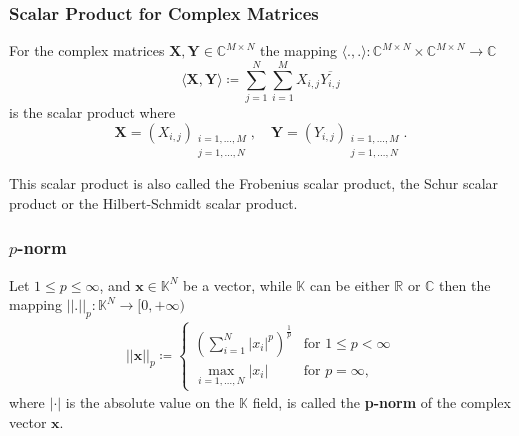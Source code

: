   \begin{frame}
    \frametitle{Scalar Product for Complex Matrices}
  \begin{Def}\label{def:scalar_product_induced_norm_complex_matrices}
      For the complex matrices $\boldsymbol{X},\boldsymbol{Y} \in \mathbb{C}^{M \times N}$ the mapping $\langle\boldsymbol{.},\boldsymbol{.}\rangle \colon \mathbb{C}^{M \times N} \times \mathbb{C}^{M \times N} \to \mathbb{C}$ 
      \begin{equation}
          \langle\boldsymbol{X},\boldsymbol{Y}\rangle \coloneqq \sum_{j=1}^{N}\sum_{i=1}^{M} X_{i,j} \overline{Y_{i,j}} 
      \end{equation}
      is the scalar product where
      \begin{equation}
          \boldsymbol{X} = \left(X_{i,j}\right)_{\substack{i=1,\ldots,M\\ j=1,\ldots,N}}, \quad \boldsymbol{Y} = \left(Y_{i,j}\right)_{\substack{i=1,\ldots,M\\ j=1,\ldots,N}}.
      \end{equation}    
  \end{Def}
  \noindent This scalar product is also called the Frobenius scalar product, the Schur scalar product or 
  the Hilbert-Schmidt scalar product.
  
  \end{frame}
  
  
  
  \begin{frame}
    \frametitle{$p$-norm}
    \begin{Def}\label{def:p-norm}
      Let $1 \leq p \leq \infty$, and $\boldsymbol{x} \in \mathbb{K}^N$ be a vector, while $\mathbb{K}$ can be either $\mathbb{R}$ or $\mathbb{C}$ then the mapping $\left|\left| \boldsymbol{.} \right|\right|_p \colon \mathbb{K}^N \to [0,+\infty)$
      \begin{equation}
          \begin{split} 
              \left|\left|\boldsymbol{x}\right|\right|_p \coloneqq    
              \begin{cases}
                  \left(\sum_{i=1}^{N}\left|x_i\right|^p\right)^{\frac{1}{p}} & \text{for } 1 \leq p < \infty\\
                  \underset{{i=1,\dots,N}}{\max} \left|x_i\right| & \text{for } p = \infty,
              \end{cases}
          \end{split}
      \end{equation}
      where $\left|\boldsymbol{\cdot}\right|$ is the absolute value on the $\mathbb{K}$ field,
      is called the \textbf{p-norm} of the complex vector $\boldsymbol{x}$.
  \end{Def}
  
  \end{frame}
  